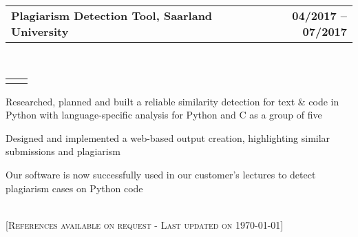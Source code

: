 \documentclass[]{lukas-cv-openfont}
\makeatletter
\newcommand{\headerrow}[2]
{\begin{tabular*}{\linewidth}{l@{\extracolsep{\fill}}r}
	\fontspec{Helvetica}\fontsize{12pt}{12pt}\selectfont\bfseries{\color{subheadings}#1} &
	\fontspec{Helvetica}\fontsize{12pt}{12pt}\selectfont\bfseries{\color{subheadings}#2} \\
\end{tabular*}}
\newcommand{\locationrow}[2]
{\begin{tabular*}{\linewidth}{l@{\extracolsep{\fill}}r}
        \color{headings}\scshape\fontspec{Heiti TC Medium}\fontsize{10pt}{12pt}\selectfont{#1}  &
        \color{headings}\scshape\fontspec{Heiti TC Medium}\fontsize{10pt}{12pt}\selectfont{#2}  \\
\end{tabular*}}
\makeatother
\begin{document}

\noindent
\headerrow{Plagiarism Detection Tool, Saarland University}{04/2017 -- 07/2017}
\\
\locationrow{Group Project for Software Engineering Lecture}{}
\begin{tightitemize}{1.7em}
    \item Researched, planned and built a reliable similarity detection for text \& code in Python with language-specific analysis for Python and C as a group of five
    \item Designed and implemented a web-based output creation, highlighting similar submissions and plagiarism
    \item Our software is now successfully used in our customer's lectures to detect plagiarism cases on Python code
\end{tightitemize}
\largesectionsep


\ \\

[\scshape{}\fontsize{10pt}{8pt}\selectfont References available on request - Last updated on \today]
\end{document}
